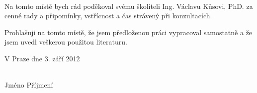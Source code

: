 %
%
%
%
%
%
%
%
%



\thispagestyle{empty}
\normalsize %
\ \vspace{10mm}

\noindent Na tomto místě bych rád poděkoval svému školiteli Ing. Václavu Kůsovi, PhD. za cenné rady a připomínky, vstřícnost a čas strávený při konzultacích. %


\vspace{0.5cm}

Prohlašuji na tomto místě, že jsem předloženou práci
vypracoval samostatně a že jsem uvedl veškerou použitou
literaturu.

\vspace{1.5cm}

\noindent
\begin{minipage}[b]{5cm}
V Praze dne 3. září 2012
\end{minipage}
\hfill
\begin{minipage}[t]{5cm}
\begin{center}
\dotfill\\
Jméno Příjmení
\end{center}
\end{minipage}

\vspace*{2cm}  

\newpage
